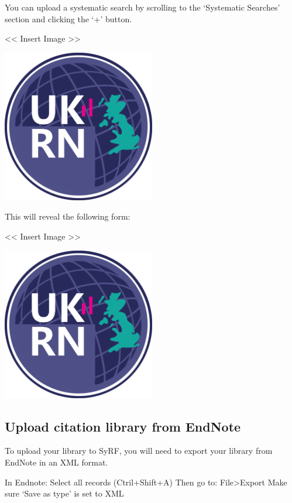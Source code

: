 \documentclass[
]{book}
\begin{document}
You can upload a systematic search by scrolling to the `Systematic Searches' section and clicking the `+' button.

\textless{}\textless{} Insert Image \textgreater{}\textgreater{}

\includegraphics[width=0.5\textwidth,height=0.5\textheight]{figs/evidence-triangle.png}

This will reveal the following form:

\textless{}\textless{} Insert Image \textgreater{}\textgreater{}

\includegraphics[width=0.5\textwidth,height=0.5\textheight]{figs/evidence-triangle.png}

\hypertarget{upload-citation-library-from-endnote}{%
\subsection{Upload citation library from EndNote}\label{upload-citation-library-from-endnote}}

To upload your library to SyRF, you will need to export your library from EndNote in an XML format.

In Endnote: Select all records (Ctril+Shift+A)
Then go to: File\textgreater{}Export
Make sure `Save as type' is set to XML
\end{document}
